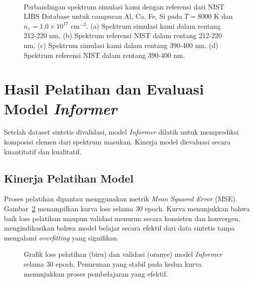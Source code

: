 \begin{figure}[H]
    \centering
    \hfill
    \\ %
    \hfill
    \caption{Perbandingan spektrum simulasi kami dengan referensi dari NIST LIBS Database untuk campuran Al, Ca, Fe, Si pada $T = 8000$ K dan $n_e = 1.0 \times 10^{17}$ cm$^{-3}$. (a) Spektrum simulasi kami dalam rentang 212-220 nm. (b) Spektrum referensi NIST dalam rentang 212-220 nm. (c) Spektrum simulasi kami dalam rentang 390-400 nm. (d) Spektrum referensi NIST dalam rentang 390-400 nm.}
    \label{fig:nist_comparison}
\end{figure}



\section{Hasil Pelatihan dan Evaluasi Model \textit{Informer}}
\label{sec:hasil_evaluasi_model}
Setelah dataset sintetis divalidasi, model \textit{Informer} dilatih untuk memprediksi komposisi elemen dari spektrum masukan. Kinerja model dievaluasi secara kuantitatif dan kualitatif.

\subsection{Kinerja Pelatihan Model}
Proses pelatihan dipantau menggunakan metrik \textit{Mean Squared Error} (MSE). Gambar~\ref{fig:training_loss} menampilkan kurva loss selama 30 epoch. Kurva menunjukkan bahwa baik loss pelatihan maupun validasi menurun secara konsisten dan konvergen, mengindikasikan bahwa model belajar secara efektif dari data sintetis tanpa mengalami \textit{overfitting} yang signifikan.

\begin{figure}[H]
    \centering
    \caption{Grafik loss pelatihan (biru) dan validasi (oranye) model \textit{Informer} selama 30 epoch. Penurunan yang stabil pada kedua kurva menunjukkan proses pembelajaran yang efektif.}
    \label{fig:training_loss}
\end{figure}

